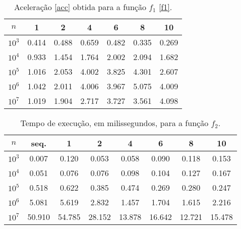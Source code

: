 \documentclass{article}
\begin{document}
    \begin{table}[h!]
      \centering
      \begin{tabular}{||c c c c c c c||}
        \hline
        $n$ & 1 & 2 & 4 & 6 & 8 & 10 \\ 
        \hline \hline
        $10^{3}$ & 0.414 & 0.488 & 0.659 & 0.482 & 0.335 & 0.269 \\ 
        \hline 
        $10^{4}$ & 0.933 & 1.454 & 1.764 & 2.002 & 2.094 & 1.682 \\ 
        \hline 
        $10^{5}$ & 1.016 & 2.053 & 4.002 & 3.825 & 4.301 & 2.607 \\ 
        \hline 
        $10^{6}$ & 1.042 & 2.011 & 4.006 & 3.967 & 5.075 & 4.009 \\ 
        \hline 
        $10^{7}$ & 1.019 & 1.904 & 2.717 & 3.727 & 3.561 & 4.098 \\ 
        \hline 
      \end{tabular}
      \caption{Aceleração \eqref{acc} obtida para a função $f_1$ \eqref{f1}. }
      \label{f1a}
    \end{table}

      \begin{table}[h!]
        \centering
        \begin{tabular}{||c c c c c c c c||}
          \hline
          $n$ & seq. & 1 & 2 & 4 & 6 & 8 & 10 \\ 
          \hline \hline
          $10^{3}$ & 0.007 & 0.120 & 0.053 & 0.058 & 0.090 & 0.118 & 0.153 \\ 
          \hline 
          $10^{4}$ & 0.051 & 0.076 & 0.076 & 0.098 & 0.104 & 0.127 & 0.167 \\ 
          \hline 
          $10^{5}$ & 0.518 & 0.622 & 0.385 & 0.474 & 0.269 & 0.280 & 0.247 \\ 
          \hline 
          $10^{6}$ & 5.081 & 5.619 & 2.832 & 1.457 & 1.704 & 1.615 & 2.216 \\ 
          \hline 
          $10^{7}$ & 50.910 & 54.785 & 28.152 & 13.878 & 16.642 & 12.721 & 15.478 \\ 
          \hline 
        \end{tabular}
        \caption{Tempo de execução, em milissegundos, para a função $f_2$.}
        \label{f2t}
      \end{table}
    
\end{document}
